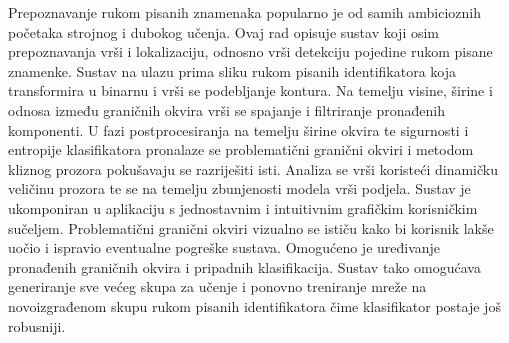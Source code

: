 \documentclass[times, utf8, diplomski]{fer}
\theoremstyle{definition}
\begin{document}
\begin{sazetak}
	Prepoznavanje rukom pisanih znamenaka popularno je od samih ambicioznih početaka strojnog i dubokog učenja. Ovaj rad opisuje sustav koji osim prepoznavanja vrši i lokalizaciju, odnosno vrši detekciju pojedine rukom pisane znamenke. Sustav na ulazu prima sliku rukom pisanih identifikatora koja transformira u binarnu i vrši se podebljanje kontura. Na temelju visine, širine i odnosa između graničnih okvira vrši se spajanje i filtriranje pronađenih komponenti. U fazi postprocesiranja na temelju širine okvira te sigurnosti i entropije klasifikatora pronalaze se problematični granični okviri i metodom kliznog prozora pokušavaju se razriješiti isti. Analiza se vrši koristeći dinamičku veličinu prozora te se na temelju zbunjenosti modela vrši podjela. Sustav je ukomponiran u aplikaciju s jednostavnim i intuitivnim grafičkim korisničkim sučeljem. Problematični granični okviri vizualno se ističu kako bi korisnik lakše uočio i ispravio eventualne pogreške sustava. Omogućeno je uređivanje pronađenih graničnih okvira i pripadnih klasifikacija. Sustav tako omogućava generiranje sve većeg skupa za učenje i ponovno treniranje mreže na novoizgrađenom skupu rukom pisanih identifikatora čime klasifikator postaje  još robusniji. 
	
\end{sazetak}
\newpage
\end{document}
